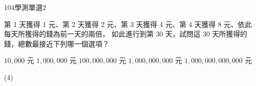     \begin{QUESTION}
        \begin{ExamInfo}{104}{學測}{單選}{2}
        \end{ExamInfo}
        \begin{ExamAnsRateInfo}{68}{88}{72}{44}
        \end{ExamAnsRateInfo}
        \begin{QBODY}
            第 1 天獲得 1 元、第 2 天獲得 2 元、第 3 天獲得 4 元、第 4 天獲得 8 元、依此每天所獲得的錢為前一天的兩倍， 如此進行到第 30 天，試問這 30 天所獲得的錢，總數最接近下列哪一個選項？
		\begin{QOPS}
			\QOP $10,000$ 元
			\QOP $1,000,000$ 元
			\QOP $100,000,000$ 元
			\QOP $1,000,000,000$ 元
			\QOP $1,000,000,000,000$ 元
		\end{QOPS}
        \end{QBODY}
        \begin{QFROMS}
        \end{QFROMS}
        \begin{QTAGS}\end{QTAGS}
        \begin{QANS}
            (4)
        \end{QANS}
        \begin{QSOLLIST}
        \end{QSOLLIST}
        \begin{QEMPTYSPACE}
        \end{QEMPTYSPACE}
    \end{QUESTION}
